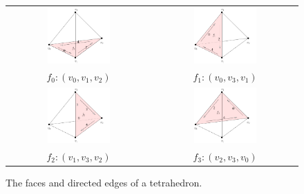 \begin{figure}
  \centering
  \begin{tabular}{cc}
  \includegraphics[width=0.45\textwidth]{../figs/triface-f0} &
  \includegraphics[width=0.45\textwidth]{../figs/triface-f1} \\
  $f_0: (v_0, v_1, v_2)$ & $f_1: (v_0, v_3, v_1)$\\
  \includegraphics[width=0.45\textwidth]{../figs/triface-f2} &
  \includegraphics[width=0.45\textwidth]{../figs/triface-f3} \\
  $f_2: (v_1, v_3, v_2)$ & $f_3: (v_2, v_3, v_0)$
  \end{tabular}
\caption{The faces and directed edges of a tetrahedron.}
\label{fig:triface}
\end{figure}
 
